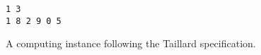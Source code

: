 \begin{figure}[htp!]
    \centering
    \begin{Verbatim}[frame=single]
1 3
1 8 2 9 0 5
    \end{Verbatim}
    \vspace{-.5cm}
    \caption{A computing instance following the Taillard specification.}
    \label{fig:taillard}
\end{figure}
